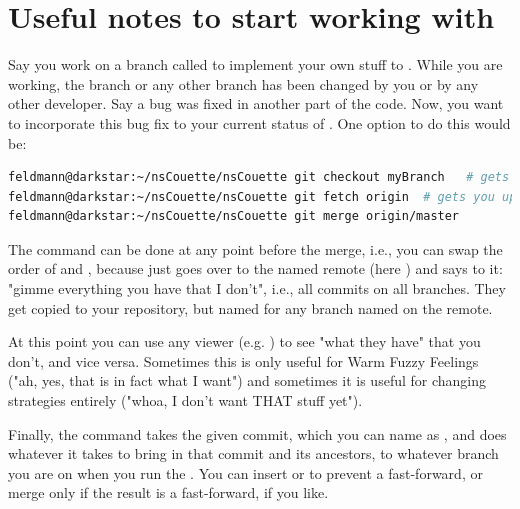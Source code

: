 \documentclass[a4paper, 11pt, DIV=11]{scrartcl}
\begin{document}
\section{Useful notes to start working with }
\label{app:git}

Say you work on a branch called  to implement your own stuff to \nsc.
While you are working, the  branch or any other branch has been changed
by you or by any other developer. Say a bug was fixed in another part of the code.
Now, you want to incorporate this bug fix to your current status of .
One option to do this would be:
\begin{lstlisting}[language=bash]
feldmann@darkstar:~/nsCouette/nsCouette git checkout myBranch   # gets you on your branch
feldmann@darkstar:~/nsCouette/nsCouette git fetch origin  # gets you up to date
feldmann@darkstar:~/nsCouette/nsCouette git merge origin/master
\end{lstlisting}
The  command can be done at any point before the merge, i.e., you can swap the order
of  and , because  just goes over to the named
remote (here ) and says to it: "gimme everything you have that I don't", i.e.,
all commits on all branches. They get copied to your repository, but named 
for any branch named  on the remote.
\par
At this point you can use any viewer (e.g. ) to see "what they have" that you don't,
and vice versa. Sometimes this is only useful for Warm Fuzzy Feelings ("ah, yes, that is in fact
what I want") and sometimes it is useful for changing strategies entirely ("whoa, I don't want
THAT stuff yet").
\par
Finally, the  command takes the given commit, which you can name as ,
and does whatever it takes to bring in that commit and its ancestors, to whatever branch you are on
when you run the . You can insert  or  to prevent a
fast-forward, or merge only if the result is a fast-forward, if you like.



\end{document}
